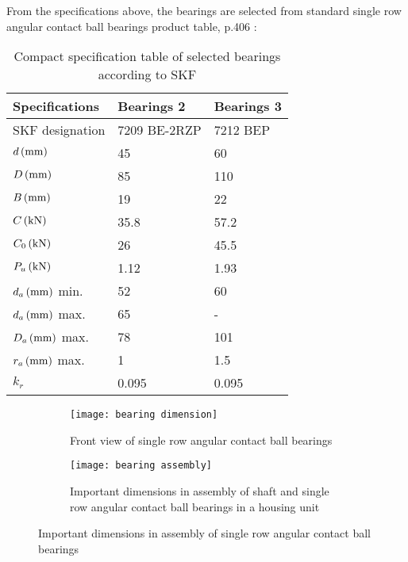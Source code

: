 From the specifications above, the bearings are selected from standard single row angular contact ball bearings product table, p.406 \cite{rolling_bearings}:
\begin{table}[ht]
	\centering
	\caption{Compact specification table of selected bearings according to SKF \cite{rolling_bearings}}
	\begin{tabular}{lll}\toprule
		Specifications & Bearings 2 & Bearings 3 \\ \midrule
		SKF designation & 7209 BE-2RZP & 7212 BEP\\
		$ d \, (\mathrm{mm}) $ & 45 & 60\\
		$ D \, (\mathrm{mm}) $ & 85 & 110\\
		$ B \, (\mathrm{mm}) $ & 19 & 22\\
		$ C \, (\mathrm{kN}) $ & 35.8 & 57.2\\
		$ C_0 \, (\mathrm{kN}) $ & 26 & 45.5\\
		$ P_u \, (\mathrm{kN}) $ & 1.12 & 1.93\\
		$ d_a \, (\mathrm{mm}) $ min. & 52 & 60\\
		$ d_a \, (\mathrm{mm}) $ max. & 65 & -\\
		$ D_a \, (\mathrm{mm}) $ max. & 78 & 101\\
		$ r_a \, (\mathrm{mm}) $ max. & 1 & 1.5\\
		$ k_r $ & 0.095 & 0.095\\
		\bottomrule
	\end{tabular}
	\label{bearingspecs}
\end{table}

\begin{figure}[ht]
	\centering
	\begin{subfigure}{.4\linewidth}
		\centering
		\texttt{[image: bearing dimension]}
		\caption{Front view of single row angular contact ball bearings}
		\label{bearingdim}
	\end{subfigure}\hspace*{0.1\linewidth}
	\begin{subfigure}{.4\linewidth}
		\centering
		\texttt{[image: bearing assembly]}
		\caption{Important dimensions in assembly of shaft and single row angular contact ball bearings in a housing unit}
		\label{bearingass}
	\end{subfigure}
	\caption{Important dimensions in assembly of single row angular contact ball bearings \cite{rolling_bearings}}
	\label{bearingdimass}
\end{figure}

